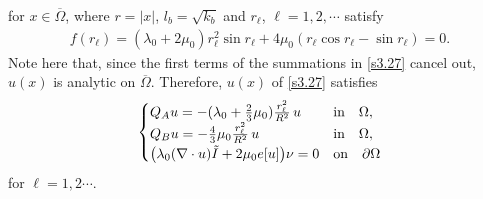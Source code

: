 \documentclass[a4paper,12pt]{article}
\newtheorem{a priori condition}[Th]{A priori condition}
\begin{document}
for $x\in\overline\Omega$, where $r=|x|$, $l_b=\sqrt{k_b}$ and $r_\ell$, $\ell=1,2,\cdots$ satisfy 
\begin{equation}\label{s3.28}
\begin{aligned}
f(r_\ell)=(\lambda_0+2\mu_0)r^2_\ell\sin r_\ell+4\mu_0(r_\ell\cos r_\ell-\sin r_\ell)=0.
\end{aligned}
\end{equation}
Note here that, since the first terms of the summations in \eqref{s3.27} cancel out, $u(x)$ is analytic on $\overline\Omega$. Therefore, $u(x)$ of \eqref{s3.27} satisfies
\begin{equation}\label{s3.29}
\begin{array}{l}
\begin{cases}
Q_Au=-(\lambda_0+\frac{2}{3}\mu_0)\frac{r_\ell^2}{R^2}\, u\quad &\mbox{\rm in}\quad \Omega,\\
Q_Bu=-\frac{4}{3}\mu_0\frac{r_\ell^2}{R^2}\, u\quad &\mbox{\rm in}\quad \Omega,\\
\big(\lambda_0(\nabla \cdot u)\tilde I+2\mu_0e[u]\big)\nu=0     & {\rm on}\quad \partial \Omega
\end{cases}
\end{array} 
\end{equation}
for $\ell=1,2\cdots$.
\end{document}
